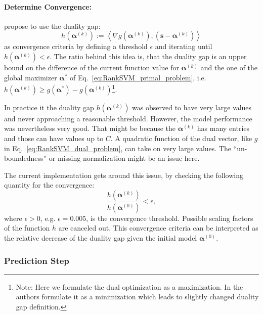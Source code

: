\documentclass[10p]{article}
\newcommand{\defi}{:=}
\newcommand{\balpha}{\boldsymbol{\alpha}}
\begin{document}
\paragraph{Determine Convergence:}
\textcite{Jaggi2013} propose to use the duality gap:
\begin{equation}
    h\left(\balpha^{(k)}\right)\defi\left\langle\nabla g\left(\balpha^{(k)}\right),\left(\mathbf{s}-\balpha^{(k)}\right)\right\rangle
\end{equation}
as convergence criteria by defining a threshold $\epsilon$ and iterating until $h(\balpha^{(k)})<\epsilon$. The ratio behind this idea is, that the duality gap is an upper bound on the difference of the current function value for $\balpha^{(k)}$ and the one of the global maximizer $\balpha^*$ of Eq.~\eqref{eq:RankSVM_primal_problem}, i.e. $h\left(\balpha^{(k)}\right)\geq g\left(\balpha^*\right)-g\left(\balpha^{(k)}\right)$\footnote{Note: Here we formulate the dual optimization as a maximization. In \cite{Jaggi2013} the authors formulate it as a minimization which leads to slightly changed duality gap definition.}. 
\begin{mdframed}[style=openquestion]
    In practice it the duality gap $h\left(\balpha^{(k)}\right)$ was observed to have very large values and never approaching a reasonable threshold. However, the model performance was nevertheless very good. That might be because the $\balpha^{(k)}$ has many entries and those can have values up to $C$. A quadratic function of the dual vector, like $g$ in Eq.~\eqref{eq:RankSVM_dual_problem}, can take on very large values. The ``un-boundedness'' or missing normalization might be an issue here.  
    
    The current implementation gets around this issue, by checking the following quantity for the convergence:
\begin{equation}
    \frac{h(\balpha^{(k)})}{h(\balpha^{(0)})}<\epsilon,
\end{equation}
    where $\epsilon>0$, e.g. $\epsilon=0.005$, is the convergence threshold. Possible scaling factors of the function $h$ are canceled out. This convergence criteria can be interpreted as the relative decrease of the duality gap given the initial model $\balpha^{(0)}$. 
\end{mdframed}

\subsubsection{Prediction Step}
 
\end{document}
